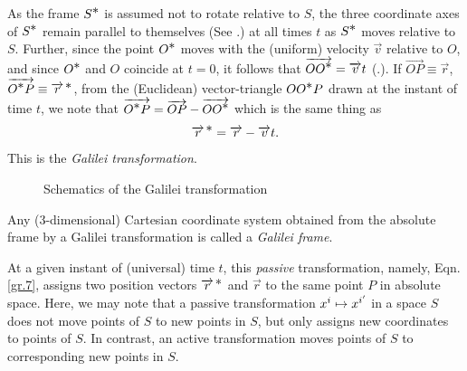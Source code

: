 As  the frame $S^{\textstyle \ast}$ is assumed not to rotate 
relative to $S$, the three coordinate axes of $S^{\textstyle \ast}$ 
remain parallel to themselves (See .) at 
all times $t$ as $S^{\textstyle \ast}$ moves relative to $S$. 
Further, since the point $O^{\textstyle \ast}$ moves with the 
(uniform) velocity $\vec{v}$ relative to $O$, and since 
$O^{\textstyle \ast}$ and $O$ coincide at $t=0$, it follows that 
$\overrightarrow{OO^{\textstyle \ast}}=\overrightarrow{v}t$ (.). If 
$\vec{OP}\equiv\vec{r}$, $\overrightarrow{O^{\textstyle \ast} 
P}\equiv{\overrightarrow{r}^{\,{\ensuremath{\textstyle \ast}}}}$, from the (Euclidean) vector-triangle 
$OO^{\textstyle \ast} P$ drawn at the instant of time $t$, we note 
that $\overrightarrow{O^{\textstyle \ast} P} = \overrightarrow{OP}-\overrightarrow{OO^{\textstyle \ast}}$ which is 
the same thing as
\begin{align}\label{gr.7}
{\overrightarrow{r}^{\,{\ensuremath{\textstyle \ast}}}}=\overrightarrow{r} - \overrightarrow{v}t.
\end{align}
This is the \textsl{Galilei transformation}.
\newpage
\begin{figure}[H]
\begin{center}
\caption{Schematics of the Galilei transformation}
\label{fig1.1}
\end{center}
\vspace{-.3cm}
\end{figure}

\dfn Any (3-dimensional)  Cartesian coordinate system 
obtained from the absolute frame by a Galilei transformation 
is called a \textsl{Galilei frame}. 
\enlargethispage*{1\bsk}

At a given instant of (universal) time $t$, this 
\textsl{passive} transformation, namely, Eqn.\eqref{gr.7}, 
assigns two position vectors ${\overrightarrow{r}^{\,{\textstyle \ast}}}$ and $\vec{r}$ to the 
same point $P$ in absolute space. Here, we may note that a 
passive transformation  $x^i\mapsto x^{{i'}}$  in a space 
$S$ does not move points of $S$ to new points in $S$, but 
only assigns new coordinates to  points of $S$. In contrast, 
an {active} transformation moves points of $S$ to 
corresponding new points in $S$.

